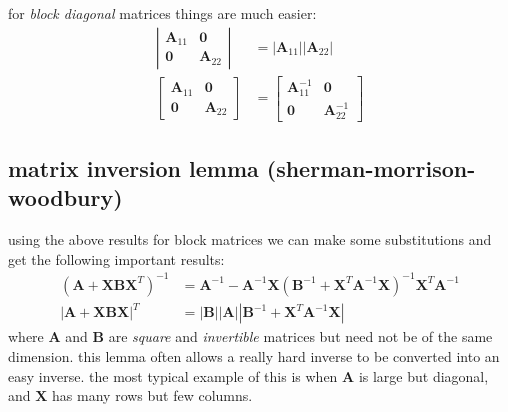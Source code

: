 \documentclass[11pt]{article}
\newcommand{\mat}[1]{\mathbf{#1}}
\renewcommand{\t}{T}
\newcommand{\inv}{{-1}}
\numberwithin{equation}{subsection}
\begin{document}
for \textit{block diagonal} matrices things are much easier:
\begin{align}
\left| 
	\begin{array}{cc}
		\mat{A}_{11}  & \mat{0}     \\
		\mat{0}       & \mat{A}_{22}
	\end{array}
\right| & = |\mat{A}_{11}||\mat{A}_{22}| \\
\left[
	\begin{array}{cc}
		\mat{A}_{11}  & \mat{0}      \\
		\mat{0}       & \mat{A}_{22}
	\end{array}
\right] & = 
\left[
	\begin{array}{cc}
		\mat{A}_{11}^\inv & \mat{0} \\
		\mat{0}           & \mat{A}_{22}^\inv
	\end{array}
\right]
\end{align}

\subsection{matrix inversion lemma (sherman-morrison-woodbury)}
using the above results for block matrices we can make some
substitutions and get the following important results:
\begin{align}
(\mat{A} + \mat{XBX}^\t)^\inv & = \mat{A}^\inv - \mat{A}^\inv \mat{X}
	(\mat{B}^\inv + \mat{X}^\t \mat{A}^\inv \mat{X})^\inv \mat{X}^\t 
	\mat{A}^\inv \\
|\mat{A} + \mat{X}\mat{B}\mat{X}|^\t & = |\mat{B}||\mat{A}|
	|\mat{B}^\inv + \mat{X}^\t \mat{A}^\inv \mat{X}|
\end{align}
where $\mat{A}$ and $\mat{B}$ are \textit{square} and \textit{invertible}
matrices but need not be of the same dimension. this lemma often allows 
a really hard inverse to be converted into an easy inverse. the most 
typical example of this is when $\mat{A}$ is large but diagonal, and
$\mat{X}$ has many rows but few columns.
\end{document}

